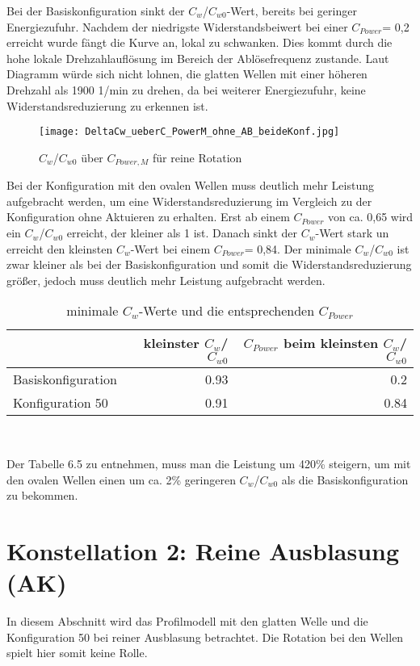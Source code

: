 Bei der Basiskonfiguration sinkt der $C_{w}$/$C_{w0}$-Wert, bereits bei geringer Energiezufuhr.  Nachdem der niedrigste Widerstandsbeiwert bei einer $C_{Power}$= 0,2 erreicht wurde f\"angt die Kurve an, lokal zu schwanken. Dies kommt durch die hohe lokale Drehzahlaufl\"osung im Bereich der Abl\"osefrequenz zustande. Laut Diagramm w\"urde sich nicht lohnen, die glatten Wellen mit einer h\"oheren Drehzahl als 1900  1/min zu drehen, da bei weiterer Energiezufuhr, keine Widerstandsreduzierung zu erkennen ist.
\begin{figure}[h]
	\centering
	\texttt{[image: DeltaCw\_ueberC\_PowerM\_ohne\_AB\_beideKonf.jpg]}
	\caption{ $C_{w}$/$C_{w0}$ \"uber $C_{Power,M}$ f\"ur reine Rotation  }
	\label{fig:Cw-Cw0-CpowerM_reine}
\end{figure}
Bei der Konfiguration mit den ovalen Wellen muss deutlich mehr Leistung aufgebracht werden, um eine Widerstandsreduzierung im Vergleich zu der Konfiguration ohne Aktuieren zu erhalten.  Erst ab einem $C_{Power}$ von ca. 0,65 wird ein $C_{w}$/$C_{w0}$ erreicht, der kleiner als 1 ist. 
Danach sinkt der $C_{w}$-Wert stark un erreicht den kleinsten $C_{w}$-Wert bei einem $C_{Power}$= 0,84. 
Der minimale $C_{w}$/$C_{w0}$ ist zwar kleiner als bei der Basiskonfiguration und somit die Widerstandsreduzierung gr\"o\ss{}er, jedoch muss deutlich mehr Leistung aufgebracht werden.
\begin{table}[h]
	\centering
	\begin{tabular}{lrr}
		\toprule
		 & kleinster  $C_{w}$/$C_{w0}$ & $C_{Power}$ beim kleinsten $C_{w}$/$C_{w0}$ \\
		\midrule
		Basiskonfiguration & 0.93 & 0.2\\
		Konfiguration 50 & 0.91 & 0.84\\
		\bottomrule
	\end{tabular}\\
	\caption{ minimale  $C_{w}$-Werte und die entsprechenden $C_{Power}$ }
	\label{tab:minimalCw-Cpower}
\end{table}
Der Tabelle 6.5 zu entnehmen, muss man die Leistung um 420\% steigern, um mit den ovalen Wellen einen um ca. 2\% geringeren $C_{w}$/$C_{w0}$ als die Basiskonfiguration zu bekommen.


\section{Konstellation 2: Reine Ausblasung (AK)}
\label{s:reineAusblasung}
In diesem Abschnitt wird das Profilmodell mit den glatten Welle und die Konfiguration 50 bei reiner Ausblasung betrachtet. Die Rotation bei den Wellen spielt hier somit keine Rolle. 

